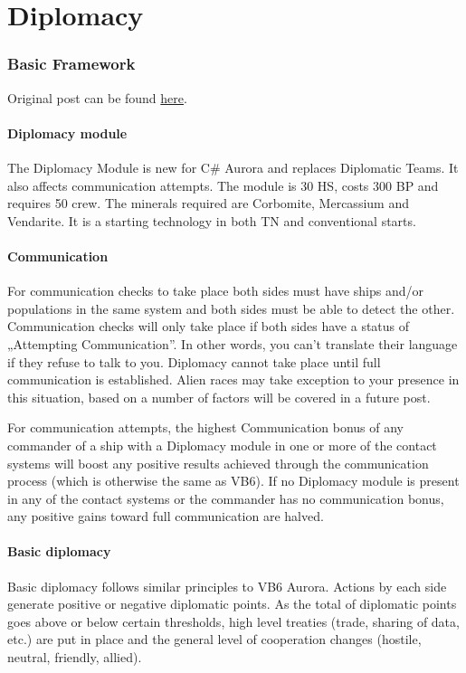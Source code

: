 \documentclass[10pt,a4paper,oneside]{article}
\begin{document}
\newpage
\part{Diplomacy}
\section{Basic Framework}\label{1_basic_framework}
Original post can be found
\href{http://aurora2.pentarch.org/index.php?topic=8495.msg118258#msg118258}{here}.

\subsection{Diplomacy module}
The Diplomacy Module is new for C\# Aurora and replaces Diplomatic Teams. It also affects communication attempts. The module is 30 HS, costs 300 BP and requires 50 crew. The minerals required are Corbomite, Mercassium and Vendarite. It is a starting technology in both TN and conventional starts.

\subsection{Communication}
For communication checks to take place both sides must have ships and/or populations in the same system and both sides must be able to detect the other. Communication checks will only take place if both sides have a status of „Attempting Communication”. In other words, you can't translate their language if they refuse to talk to you. Diplomacy cannot take place until full communication is established. Alien races may take exception to your presence in this situation, based on a number of factors will be covered in a future post.

For communication attempts, the highest Communication bonus of any commander of a ship with a Diplomacy module in one or more of the contact systems will boost any positive results achieved through the communication process (which is otherwise the same as VB6). If no Diplomacy module is present in any of the contact systems or the commander has no communication bonus, any positive gains toward full communication are halved.

\subsection{Basic diplomacy}
Basic diplomacy follows similar principles to VB6 Aurora. Actions by each side generate positive or negative diplomatic points. As the total of diplomatic points goes above or below certain thresholds, high level treaties (trade, sharing of data, etc.) are put in place and the general level of cooperation changes (hostile, neutral, friendly, allied).
\end{document}

